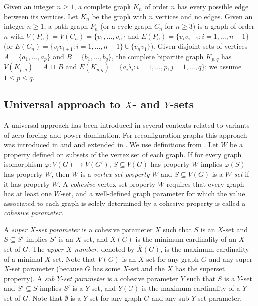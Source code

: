 \documentclass{article}
\numberwithin{figure}{section}
\numberwithin{table}{section}
\numberwithin{equation}{section}
\theoremstyle{definition}
\theoremstyle{definition}
\theoremstyle{definition}
\newcommand {\du} {\,\sqcup\,}
\newcommand{\ol}{\overline}
\newcommand{\xbar}{\ol X}
\begin{document}
Given an integer $n \geq 1$, a  complete graph $K_n$ of order $n$ has every possible edge between its vertices. 
Let $\ol{K_n}$ be the graph with $n$ vertices and no edges. 
Given an integer $n \geq 1$, a  path graph $P_n$ (or a cycle graph $C_n$ for $n\ge 3$) is a graph of order $n$ with $V(P_n)=V(C_n)=\{v_1,\dots,v_n\}$ and $E(P_n)=\{v_iv_{i+1}:i=1,
\dots,n-1\}$ (or $E(C_n)=\{v_iv_{i+1}:i=1,
\dots,n-1\}\cup\{v_nv_1\}$).
Given  disjoint sets  of vertices $A=\{a_1,\dots,a_p\}$ and $B=\{b_1,\dots,b_q\}$, the complete bipartite graph   $K_{p,q}$ has $V(K_{p,q})=A\du B$ and $E(K_{p,q})=\{a_ib_j: i=1,\dots,p, j=1,\dots,q\}$; we assume $1\le p\le q$.  


\subsection{Universal approach to $X$- and $Y$-sets}\label{ss:uniXY}
A universal approach has been introduced in several contexts related to variants of zero forcing and power domination. For reconfiguration graphs this approach was introduced in \cite{PDrecon} and \cite{XTARiso} and extended in \cite{XTAR-YTAR}. 
We use definitions from \cite{XTAR-YTAR}.  Let $W$ be a property defined on subsets of the vertex set of each graph. If for every graph isomorphism $\varphi: V(G) \to V(G')$, $S\subseteq V(G)$ has property $W$ implies $\varphi(S)$ has property $W$, then $W$ is a \emph{vertex-set property} $W$ and $S\subseteq V(G)$ is a \emph{$W$-set} if it has property $W$. 
 A \emph{cohesive} vertex-set property $W$ requires that every graph has at least one $W$-set, and a well-defined graph parameter for which the value associated to each graph is solely determined by a cohesive property is called a \emph{cohesive parameter}.

A \emph{super $X$-set 
parameter}  is a cohesive parameter $X$ such that $S$ is an $X$-set and $S\subseteq S'$ implies  $S'$ is an $X$-set, and  $X(G)$ is  the minimum cardinality of an $X$-set of $G$. The \emph{upper $X$ number}, denoted by  $\xbar(G)$, is the maximum cardinality of a minimal $X$-set.   Note that $V(G)$ is an $X$-set for any graph $G$ and any super $X$-set parameter (because $G$ has some $X$-set and the $X$ has the superset property).
 A \emph{sub $Y$-set parameter}  is a cohesive parameter $Y$ such that $S$ is a $Y$-set and $S'\subseteq S$ implies  $S'$ is a $Y$-set, and  $Y(G)$ is  the maximum cardinality of a $Y$-set of $G$.   Note that $\emptyset$ is a $Y$-set for any graph $G$ and any sub $Y$-set parameter. 
\end{document}
